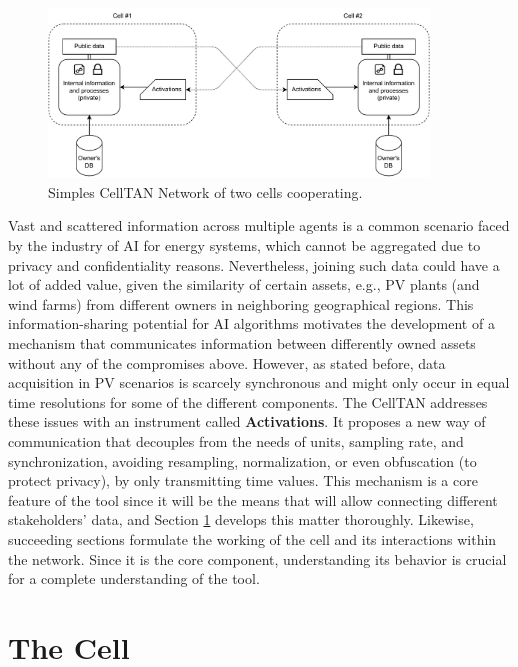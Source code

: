 \begin{figure}[h!]
    \centering
    \includegraphics[width=0.9\textwidth]{figures/chapter4/cell/intro.pdf}
    \caption{Simples CellTAN Network of two cells cooperating.}
    \label{fig:celltanintro}
\end{figure}

Vast and scattered information across multiple agents is a common scenario faced by the industry of AI for energy systems, which cannot be aggregated due to privacy and confidentiality reasons. Nevertheless, joining such data could have a lot of added value, given the similarity of certain assets, e.g., PV plants (and wind farms) from different owners in neighboring geographical regions. This information-sharing potential for AI algorithms motivates the development of a mechanism that communicates information between differently owned assets without any of the compromises above. However, as stated before, data acquisition in PV scenarios is scarcely synchronous and might only occur in equal time resolutions for some of the different components. The CellTAN addresses these issues with an instrument called \textbf{Activations}. It proposes a new way of communication that decouples from the needs of units, sampling rate, and synchronization, avoiding resampling, normalization, or even obfuscation (to protect privacy), by only transmitting time values. This mechanism is a core feature of the tool since it will be the means that will allow connecting different stakeholders' data, and Section \ref{sec:thecell} develops this matter thoroughly. Likewise, succeeding sections formulate the working of the cell and its interactions within the network. Since it is the core component, understanding its behavior is crucial for a complete understanding of the tool.

\section{The Cell} \label{sec:thecell}

